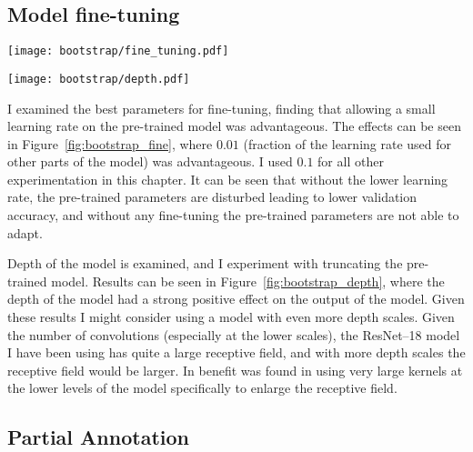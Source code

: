 \subsection{Model fine-tuning}

\begin{figure*}[!ht]
\centering
  \centering
  \texttt{[image: bootstrap/fine\_tuning.pdf]}
  \caption{Influence of learning rate modifier for fine-tuning}  
  \label{fig:bootstrap_fine}
\end{figure*}
\begin{figure*}[!ht]
  \centering
  \texttt{[image: bootstrap/depth.pdf]}
  \caption{Depth of pre-trained model}  
  \label{fig:bootstrap_depth}
\end{figure*}


I examined the best parameters for fine-tuning, finding that allowing a small learning rate on the pre-trained model was advantageous. The effects can be seen in Figure~\ref{fig:bootstrap_fine}, where $0.01$ (fraction of the learning rate used for other parts of the model) was advantageous. I used $ 0.1 $ for all other experimentation in this chapter. It can be seen that without the lower learning rate, the pre-trained parameters are disturbed leading to lower validation accuracy, and without any fine-tuning the pre-trained parameters are not able to adapt.

Depth of the model is examined, and I experiment with truncating the pre-trained model. Results can be seen in Figure~\ref{fig:bootstrap_depth}, where the depth of the model had a strong positive effect on the output of the model. Given these results I might consider using a model with even more depth scales. Given the number of convolutions (especially at the lower scales), the ResNet--18 model I have been using has quite a large receptive field, and with more depth scales the receptive field would be larger. In \cite{Peng2017} benefit was found in using very large kernels at the lower levels of the model specifically to enlarge the receptive field.






\subsection {Partial Annotation}


